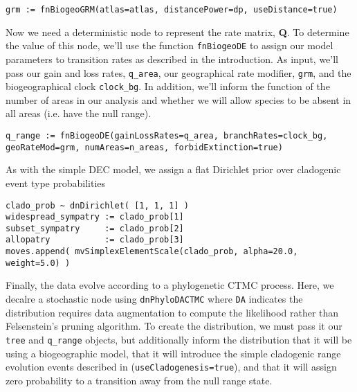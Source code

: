 \begin{snugshade}
\begin{lstlisting}
grm := fnBiogeoGRM(atlas=atlas, distancePower=dp, useDistance=true)
\end{lstlisting}
\end{snugshade}

Now we need a deterministic node to represent the rate matrix, {\bf Q}.
To determine the value of this node, we'll use the function {\tt fnBiogeoDE} to assign our model parameters to transition rates as described in the introduction.
As input, we'll pass our gain and loss rates, {\tt q\_area}, our geographical rate modifier, {\tt grm}, and the biogeographical clock {\tt clock\_bg}.
In addition, we'll inform the function of the number of areas in our analysis and whether we will allow species to be absent in all areas (i.e. have the null range).

\begin{snugshade}
\begin{lstlisting}
q_range := fnBiogeoDE(gainLossRates=q_area, branchRates=clock_bg, geoRateMod=grm, numAreas=n_areas, forbidExtinction=true)
\end{lstlisting}
\end{snugshade}

As with the simple DEC model, we assign a flat Dirichlet prior over cladogenic event type probabilities

\begin{snugshade}
\begin{lstlisting}
clado_prob ~ dnDirichlet( [1, 1, 1] )
widespread_sympatry := clado_prob[1]
subset_sympatry     := clado_prob[2]
allopatry           := clado_prob[3]
moves.append( mvSimplexElementScale(clado_prob, alpha=20.0, weight=5.0) )
\end{lstlisting}
\end{snugshade}

Finally, the data evolve according to a phylogenetic CTMC process. Here, we decalre a stochastic node using {\tt dnPhyloDACTMC} where {\tt DA} indicates the distribution requires data augmentation to compute the likelihood rather than Felsenstein's pruning algorithm.
To create the distribution, we must pass it our {\tt tree} and {\tt q\_range} objects, but additionally inform the distribution that it will be using a biogeographic model, that it will introduce the simple cladogenic range evolution events described in \citet{Ree2008} ({\tt useCladogenesis=true}), and that it will assign zero probability to a transition away from the null range state.

